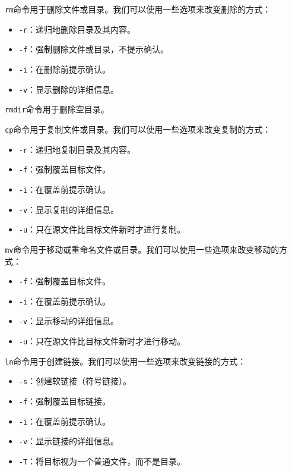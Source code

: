 \documentclass[../main.tex]{subfiles}
\begin{document}
\texttt{rm}命令用于删除文件或目录。我们可以使用一些选项来改变删除的方式：
\begin{itemize}
  \item \texttt{-r}：递归地删除目录及其内容。
  \item \texttt{-f}：强制删除文件或目录，不提示确认。
  \item \texttt{-i}：在删除前提示确认。
  \item \texttt{-v}：显示删除的详细信息。
\end{itemize}

\texttt{rmdir}命令用于删除空目录。

\texttt{cp}命令用于复制文件或目录。我们可以使用一些选项来改变复制的方式：
\begin{itemize}
  \item \texttt{-r}：递归地复制目录及其内容。
  \item \texttt{-f}：强制覆盖目标文件。
  \item \texttt{-i}：在覆盖前提示确认。
  \item \texttt{-v}：显示复制的详细信息。
  \item \texttt{-u}：只在源文件比目标文件新时才进行复制。
\end{itemize}

\texttt{mv}命令用于移动或重命名文件或目录。我们可以使用一些选项来改变移动的方式：
\begin{itemize}
  \item \texttt{-f}：强制覆盖目标文件。
  \item \texttt{-i}：在覆盖前提示确认。
  \item \texttt{-v}：显示移动的详细信息。
  \item \texttt{-u}：只在源文件比目标文件新时才进行移动。
\end{itemize}

\texttt{ln}命令用于创建链接。我们可以使用一些选项来改变链接的方式：
\begin{itemize}
  \item \texttt{-s}：创建软链接（符号链接）。
  \item \texttt{-f}：强制覆盖目标链接。
  \item \texttt{-i}：在覆盖前提示确认。
  \item \texttt{-v}：显示链接的详细信息。
  \item \texttt{-T}：将目标视为一个普通文件，而不是目录。
\end{itemize}
\end{document}
